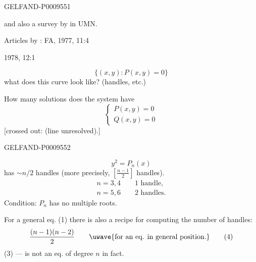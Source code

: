 \begin{GelfandAdjacentEvidence}{GELFAND-P000955}{1}

and also a survey by  in UMN.

Articles by : FA, 1977, 11:4\par
\hspace{4em}1978, 12:1

\begin{equation*}
 \{(x,y):P(x,y)=0\}
 \tag{1}
\end{equation*}
what does this curve look like? (handles, etc.)

How many solutions does the system have
\begin{equation*}
 \begin{cases}
 P(x,y)=0\\
 Q(x,y)=0
 \end{cases}
 \tag{2}
\end{equation*}
[crossed out: (line unresolved).]
\end{GelfandAdjacentEvidence}
\begin{GelfandAdjacentEvidence}{GELFAND-P000955}{2}


\begin{equation*}
 y^2=P_n(x)
 \tag{3}
\end{equation*}
has $\sim n/2$ handles (more precisely, $\left[\frac{n-1}{2}\right]$ handles).
\begin{gather*}
 n=3,4\qquad 1\text{ handle},\\
 n=5,6\qquad 2\text{ handles}.
\end{gather*}
Condition: $P_n$ has no multiple roots.

For a general eq. (1) there is also a recipe for computing the number of handles:
\begin{equation*}
 \frac{(n-1)(n-2)}{2}\qquad\text{\uwave{for an eq. in general position.}}
 \tag{4}
\end{equation*}
(3) --- is not an eq. of degree $n$ in fact.
\end{GelfandAdjacentEvidence}

